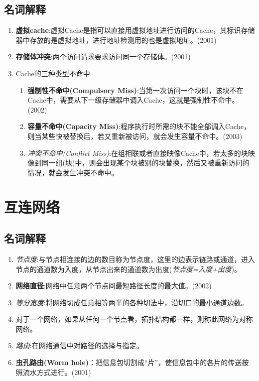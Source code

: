 \documentclass[a4paper]{ctexart}
\begin{document}
\subsection{名词解释}
\begin{enumerate}
  \item \textbf{虚拟cache}:虚拟Cache是指可以直接用虚拟地址进行访问的Cache，其标识存储器中存放的是虚拟地址，进行地址检测用的也是虚拟地址。(2001)
  \item \textbf{存储体冲突}:两个访问请求要求访问同一个存储体。(2001)
  \item Cache的三种类型不命中
  \begin{enumerate}
    \item \textbf{强制性不命中(Compulsory Miss)}:当第一次访问一个块时，该块不在Cache中，需要从下一级存储器中调入Cache，这就是强制性不命中。(2002)
    \item \textbf{容量不命中(Capacity Miss)}:程序执行时所需的块不能全部调入Cache，则当某些快被替换后，若又重新被访问，就会发生容量不命中。(2003)
    \item \emph{冲突不命中(Conflict Miss)}:在组相联或者直接映像Cache中，若太多的块映像到同一组(块)中，则会出现某个块被别的块替换，然后又被重新访问的情况，就会发生冲突不命中。
  \end{enumerate}
\end{enumerate}

\section{互连网络}
\subsection{名词解释}
\begin{enumerate}
  \item \emph{节点度}:与节点相连接的边的数目称为节点度，这里的边表示链路或通道，进入节点的通道数为入度，从节点出来的通道数为出度(\emph{节点度=入度+出度})。
  \item \textbf{网络直径}:网络中任意两个节点间最短路径长度的最大值。(2002)
  \item \emph{等分宽度}:将网络切成任意相等两半的各种切法中，沿切口的最小通道边数。
  \item 对于一个网络，如果从任何一个节点看，拓扑结构都一样，则称此网络为对称网络。
  \item \emph{路由}:在网络通信中对路径的选择与指定。
  \item \textbf{虫孔路由(Worm hole)}：把信息包切割成“片”，使信息包中的各片的传送按照流水方式进行。(2001)
\end{enumerate}
\end{document}

